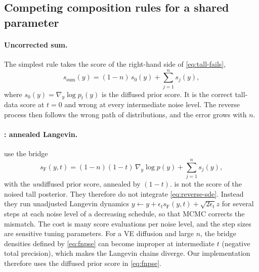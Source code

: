 \subsection{Competing composition rules for a shared parameter}\label{sec:bg-competitors}

\paragraph{Uncorrected sum.}
The simplest rule takes the score of the right-hand side of \cref{eq:tall-fails},
\begin{equation}\label{eq:uncorrected}
  s_\mathrm{sum}(y)=(1-n)\,s_0(y)+\sum_{j=1}^n s_j(y),
\end{equation}
where $s_0(y)=\nabla_y\log p_t(y)$ is the diffused prior score.
It is the correct tall-data score at $t=0$ and wrong at every intermediate noise level.
The reverse process then follows the wrong path of distributions, and the error grows with $n$.

\paragraph{\fnpse: annealed Langevin.}
\citet{geffner2023compositional} use the bridge
\begin{equation}\label{eq:fnpse}
  s_\mathrm{F}(y,t)=(1-n)(1-t)\,\nabla_y\log p(y)+\sum_{j=1}^n s_j(y),
\end{equation}
with the \emph{un}diffused prior score, annealed by $(1-t)$.
 is not the score of the noised tall posterior.
They therefore do not integrate \cref{eq:reverse-sde}.
Instead they run unadjusted Langevin dynamics $y\leftarrow y+\epsilon_t s_\mathrm{F}(y,t)+\sqrt{2\epsilon_t}z$ for several steps at each noise level of a decreasing schedule, so that MCMC corrects the mismatch.
The cost is many score evaluations per noise level, and the step sizes are sensitive tuning parameters.
For a VE diffusion and large $n$, the bridge densities defined by \cref{eq:fnpse} can become improper at intermediate $t$ (negative total precision), which makes the Langevin chains diverge.
Our implementation therefore uses the diffused prior score in \cref{eq:fnpse}.

